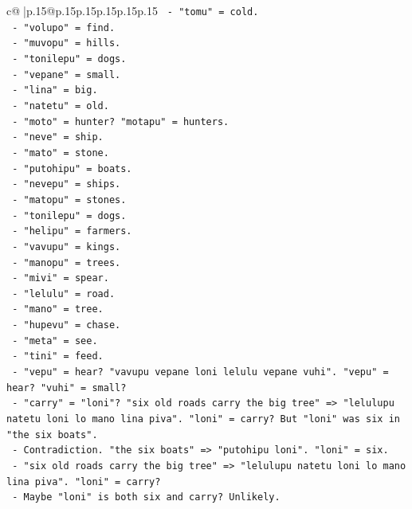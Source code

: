 \documentclass{article}
\begin{document}
{\begin{supertabular}{c@{$\;$}|p{.15\linewidth}@{}p{.15\linewidth}p{.15\linewidth}p{.15\linewidth}p{.15\linewidth}p{.15\linewidth}}
{{{\texttt{       {-} "tomu" = cold.} \\
\texttt{       {-} "volupo" = find.} \\
\texttt{       {-} "muvopu" = hills.} \\
\texttt{       {-} "tonilepu" = dogs.} \\
\texttt{       {-} "vepane" = small.} \\
\texttt{       {-} "lina" = big.} \\
\texttt{       {-} "natetu" = old.} \\
\texttt{       {-} "moto" = hunter? "motapu" = hunters.} \\
\texttt{       {-} "neve" = ship.} \\
\texttt{       {-} "mato" = stone.} \\
\texttt{       {-} "putohipu" = boats.} \\
\texttt{       {-} "nevepu" = ships.} \\
\texttt{       {-} "matopu" = stones.} \\
\texttt{       {-} "tonilepu" = dogs.} \\
\texttt{       {-} "helipu" = farmers.} \\
\texttt{       {-} "vavupu" = kings.} \\
\texttt{       {-} "manopu" = trees.} \\
\texttt{       {-} "mivi" = spear.} \\
\texttt{       {-} "lelulu" = road.} \\
\texttt{       {-} "mano" = tree.} \\
\texttt{       {-} "hupevu" = chase.} \\
\texttt{       {-} "meta" = see.} \\
\texttt{       {-} "tini" = feed.} \\
\texttt{       {-} "vepu" = hear? "vavupu vepane loni lelulu vepane vuhi". "vepu" = hear? "vuhi" = small?} \\
\texttt{       {-} "carry" = "loni"? "six old roads carry the big tree" => "lelulupu natetu loni lo mano lina piva". "loni" = carry? But "loni" was six in "the six boats".} \\
\texttt{       {-} Contradiction. "the six boats" => "putohipu loni". "loni" = six.} \\
\texttt{       {-} "six old roads carry the big tree" => "lelulupu natetu loni lo mano lina piva". "loni" = carry?} \\
\texttt{       {-} Maybe "loni" is both six and carry? Unlikely.} \\
}}}
\end{supertabular}}
\end{document}
